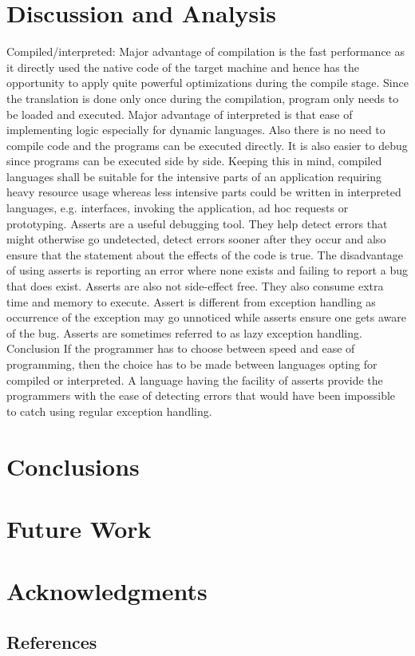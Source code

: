 \documentclass{sig-alternate}
\begin{document}
\section{Discussion and Analysis}
Compiled/interpreted: Major advantage of compilation is the fast performance as it directly used the native code of the target machine and hence has the opportunity to apply quite powerful optimizations during the compile stage. Since the translation is done only once during the compilation, program only needs to be loaded and executed. Major advantage of interpreted is that ease of implementing logic especially for dynamic languages. Also there is no need to compile code and the programs can be executed directly. It is also easier to debug since programs can be executed side by side. Keeping this in mind, compiled languages shall be suitable for the intensive parts of an application requiring heavy resource usage whereas less intensive parts could be written in interpreted languages, e.g. interfaces, invoking the application, ad hoc requests or prototyping.
Asserts are a useful debugging tool. They help detect errors that might otherwise go undetected, detect errors sooner after they occur and also ensure that the statement about the effects of the code is true. The disadvantage of using asserts is reporting an error where none exists and failing to report a bug that does exist. Asserts are also not side-effect free. They also consume extra time and memory to execute. Assert is different from exception handling as occurrence of the exception may go unnoticed while asserts ensure one gets aware of the bug. Asserts are sometimes referred to as lazy exception handling.
Conclusion
If the programmer has to choose between speed and ease of programming, then the choice has to be made between languages opting for compiled or interpreted. A language having the facility of asserts provide the programmers with the ease of detecting errors that would have been impossible to catch using regular exception handling.


\section{Conclusions}

\section{Future Work}

\section{Acknowledgments}
\subsection{References}
\end{document}

